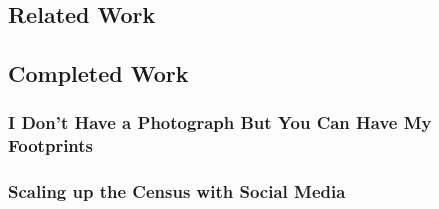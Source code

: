 
\subsection{Related Work}


\subsection{Completed Work}



\subsubsection{I Don’t Have a Photograph But You Can Have My Footprints}

\subsubsection{Scaling up the Census with Social Media}

